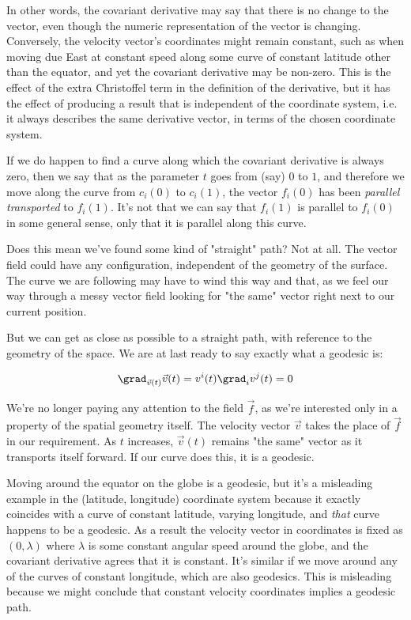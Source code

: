 In other words, the covariant derivative may say that there is no change to the vector, even though the numeric representation of the vector is changing. Conversely, the velocity vector's coordinates might remain constant, such as when moving due East at constant speed along some curve of constant latitude other than the equator, and yet the covariant derivative may be non-zero. This is the effect of the extra Christoffel term in the definition of the derivative, but it has the effect of producing a result that is independent of the coordinate system, i.e. it always describes the same derivative vector, in terms of the chosen coordinate system.

If we do happen to find a curve along which the covariant derivative is always zero, then we say that as the parameter $t$ goes from (say) $0$ to $1$, and therefore we move along the curve from $c_i(0)$ to $c_i(1)$, the vector $f_i(0)$ has been \textit{parallel transported} to $f_i(1)$. It's not that we can say that $f_i(1)$ is parallel to $f_i(0)$ in some general sense, only that it is parallel along this curve.

Does this mean we've found some kind of "straight" path? Not at all. The vector field could have any configuration, independent of the geometry of the surface. The curve we are following may have to wind this way and that, as we feel our way through a messy vector field looking for "the same" vector right next to our current position.

But we can get as close as possible to a straight path, with reference to the geometry of the space. We are at last ready to say exactly what a geodesic is:

$$
\grad_{\vec{v}(t)} \vec{v}(t)
=
v^i(t) \grad_i v^j(t) = 0
$$

We're no longer paying any attention to the field $\vec{f}$, as we're interested only in a property of the spatial geometry itself. The velocity vector $\vec{v}$ takes the place of $\vec{f}$ in our requirement. As $t$ increases, $\vec{v}(t)$ remains "the same" vector as it transports itself forward. If our curve does this, it is a geodesic.

Moving around the equator on the globe is a geodesic, but it's a misleading example in the (latitude, longitude) coordinate system because it exactly coincides with a curve of constant latitude, varying longitude, and \textit{that} curve happens to be a geodesic. As a result the velocity vector in coordinates is fixed as $(0, \lambda)$ where $\lambda$ is some constant angular speed around the globe, and the covariant derivative agrees that it is constant. It's similar if we move around any of the curves of constant longitude, which are also geodesics. This is misleading because we might conclude that constant velocity coordinates implies a geodesic path.

